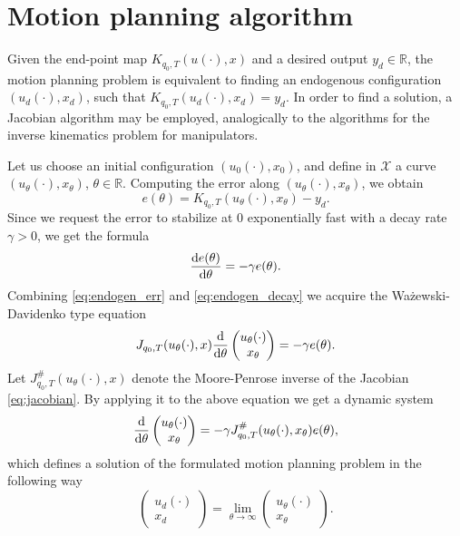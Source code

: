 \section{Motion planning algorithm}
Given the end-point map $K_{q_0, T}(u(\cdot), x)$ and a desired output $y_d\in\mathbb{R}$, the motion planning problem is equivalent to finding an endogenous
configuration $(u_d(\cdot), x_d)$, such that $K_{q_0, T}(u_d(\cdot), x_d)=y_d$. In order to find a
solution, a Jacobian algorithm may be employed, analogically to the algorithms
for the inverse kinematics problem for manipulators. 

Let us choose an initial configuration $(u_0(\cdot), x_0)$, and
define in $\mathcal{X}$ a curve $(u_\theta(\cdot), x_\theta)$, $\theta \in \mathbb{R}$.
Computing the error along $(u_\theta(\cdot), x_\theta)$, we obtain
\begin{equation}
\label{eq:endogen_err}
e(\theta)=K_{q_0, T}(u_\theta(\cdot), x_\theta)-y_d.
\end{equation}
Since we request the error to stabilize at $0$ exponentially fast with a decay rate
$\gamma>0$, we get the formula
\begin{equation}
\label{eq:endogen_decay}
\frac{\mathrm{d} e(\theta)}{\mathrm{d} \theta}=-\gamma e(\theta).
\end{equation}
Combining \eqref{eq:endogen_err} and \eqref{eq:endogen_decay} we acquire the Ważewski-Davidenko type equation
\begin{equation}
J_{q_0, T}(u_\theta(\cdot), x)\dfrac{\mathrm{d}}{\mathrm{d} \theta}\begin{pmatrix}
u_\theta(\cdot)\\ x_\theta
\end{pmatrix}=-\gamma e(\theta).
\end{equation}
Let $J^\#_{q_0, T}(u_\theta(\cdot), x)$ denote the Moore-Penrose inverse \cite{ecs_ijc}
of the Jacobian \eqref{eq:jacobian}. By applying it to the above equation we get a dynamic system
\begin{equation}
\label{eq:endogen_alg}
\dfrac{\mathrm{d}}{\mathrm{d} \theta}\begin{pmatrix}
u_\theta(\cdot)\\ x_\theta
\end{pmatrix}=-\gamma J^\#_{q_0, T}(u_\theta(\cdot), x_\theta) e(\theta),
\end{equation}
which defines a solution of the formulated motion planning problem in the following way
\begin{equation}
\begin{pmatrix}
u_d(\cdot)\\ x_d
\end{pmatrix}=\lim_{\theta\rightarrow\infty}\begin{pmatrix}
u_\theta(\cdot)\\ x_\theta
\end{pmatrix}.
\end{equation}


